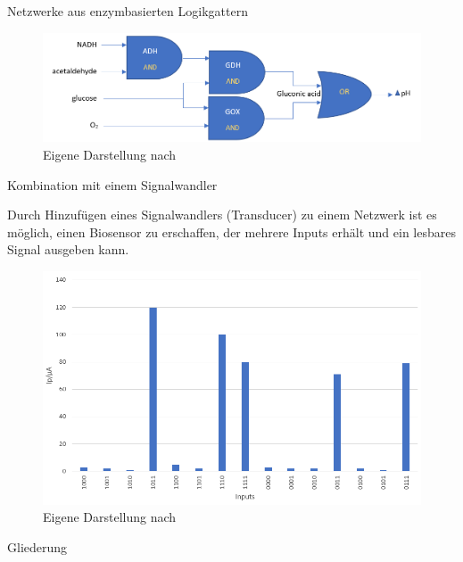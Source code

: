 \documentclass{beamer}
\begin{document}
	\begin{frame}{Netzwerke aus enzymbasierten Logikgattern}
	
	\begin{figure}
		\centering \scriptsize 
		\includegraphics[scale = 0.30]{pics/network2.png} \caption{Eigene Darstellung nach \cite{hallo4}} 
	\end{figure}

	
	\end{frame}


	\begin{frame}{Kombination mit einem Signalwandler}
	
		Durch Hinzuf{\"u}gen eines Signalwandlers (Transducer) zu einem Netzwerk ist es m{\"o}glich, einen Biosensor zu erschaffen, der mehrere Inputs erh{\"a}lt und ein lesbares Signal ausgeben kann.\\
		
		
        \begin{figure}[H] \centering \includegraphics[scale= 0.30]{pics/pH.png} \caption{Eigene Darstellung nach \cite{hallo4}} \label{img:ph} 
        \end{figure}
        
    \end{frame}
 
 
   	\begin{frame}{Gliederung}
   	\tableofcontents
	\end{frame}
\end{document}
